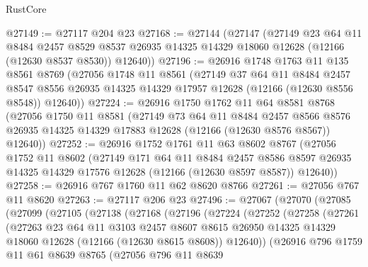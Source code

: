 \begin{lexlean}{RustCore}
\begin{coremodule}
@27149 := @27117 @204 @23
@27168 := @27144
    (@27147
      (@27149
        @23
        @64
        @11
        @8484
        @2457
        @8529
        @8537
        @26935
        @14325
        @14329
        @18060
        @12628
        (@12166 (@12630 @8537 @8530))
        @12640))
@27196 := @26916
    @1748
    @1763
    @11
    @135
    @8561
    @8769
    (@27056
      @1748
      @11
      @8561
      (@27149
        @37
        @64
        @11
        @8484
        @2457
        @8547
        @8556
        @26935
        @14325
        @14329
        @17957
        @12628
        (@12166 (@12630 @8556 @8548))
        @12640))
@27224 := @26916
    @1750
    @1762
    @11
    @64
    @8581
    @8768
    (@27056
      @1750
      @11
      @8581
      (@27149
        @73
        @64
        @11
        @8484
        @2457
        @8566
        @8576
        @26935
        @14325
        @14329
        @17883
        @12628
        (@12166 (@12630 @8576 @8567))
        @12640))
@27252 := @26916
    @1752
    @1761
    @11
    @63
    @8602
    @8767
    (@27056
      @1752
      @11
      @8602
      (@27149
        @171
        @64
        @11
        @8484
        @2457
        @8586
        @8597
        @26935
        @14325
        @14329
        @17576
        @12628
        (@12166 (@12630 @8597 @8587))
        @12640))
@27258 := @26916 @767 @1760 @11 @62 @8620 @8766
@27261 := @27056 @767 @11 @8620
@27263 := @27117 @206 @23
@27496 := @27067
    (@27070
      (@27085
        (@27099
          (@27105
            (@27138
              (@27168
                (@27196
                  (@27224
                    (@27252
                      (@27258
                        (@27261
                          (@27263
                            @23
                            @64
                            @11
                            @3103
                            @2457
                            @8607
                            @8615
                            @26950
                            @14325
                            @14329
                            @18060
                            @12628
                            (@12166 (@12630 @8615 @8608))
                            @12640))
                        (@26916
                          @796
                          @1759
                          @11
                          @61
                          @8639
                          @8765
                          (@27056
                            @796
                            @11
                            @8639

\end{coremodule}
\end{lexlean}
